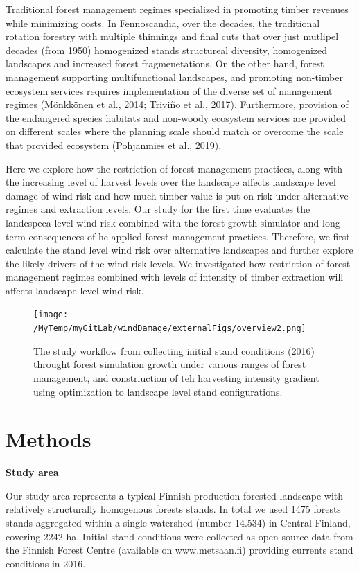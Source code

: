 \documentclass[]{elsarticle} %
\begin{document}
Traditional forest management regimes specialized in promoting timber
revenues while minimizing costs. In Fennoscandia, over the decades, the
traditional rotation forestry with multiple thinnings and final cuts
that over just mutlipel decades (from 1950) homogenized stands
structureal diversity, homogenized landscapes and increased forest
fragmenetations. On the other hand, forest management supporting
multifunctional landscapes, and promoting non-timber ecosystem services
requires implementation of the diverse set of management regimes
(Mönkkönen et al., 2014; Triviño et al., 2017). Furthermore, provision
of the endangered species habitats and non-woody ecosystem services are
provided on different scales where the planning scale should match or
overcome the scale that provided ecosystem (Pohjanmies et al., 2019).

Here we explore how the restriction of forest management practices,
along with the increasing level of harvest levels over the landscape
affects landscape level damage of wind risk and how much timber value is
put on risk under alternative regimes and extraction levels. Our study
for the first time evaluates the landcspeca level wind risk combined
with the forest growth simulator and long-term consequences of he
applied forest management practices. Therefore, we first calculate the
stand level wind risk over alternative landscapes and further explore
the likely drivers of the wind risk levels. We investigated how
restriction of forest management regimes combined with levels of
intensity of timber extraction will affects landscape level wind risk.

\begin{figure}
\centering
\texttt{[image: /MyTemp/myGitLab/windDamage/externalFigs/overview2.png]}
\caption{The study workflow from collecting initial stand conditions
(2016) throught forest simulation growth under various ranges of forest
management, and constriuction of teh harvesting intensity gradient using
optimization to landscape level stand configurations.}
\end{figure}

\section{Methods}\label{methods}

\textbf{Study area}

Our study area represents a typical Finnish production forested
landscape with relatively structurally homogenous forests stands. In
total we used 1475 forests stands aggregated within a single watershed
(number 14.534) in Central Finland, covering 2242 ha. Initial stand
conditions were collected as open source data from the Finnish Forest
Centre (available on www.metsaan.fi) providing currents stand conditions
in 2016.
\end{document}
